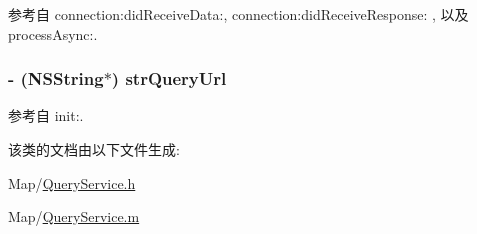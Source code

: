 参考自 connection\-:did\-Receive\-Data\-:, connection\-:did\-Receive\-Response\-: , 以及 process\-Async\-:.

\hypertarget{interface_query_service_a3bded815fbe946f576b68aecd953d43d}{
\subsubsection[{str\-Query\-Url}]{\setlength{\rightskip}{0pt plus 5cm}-\/ (N\-S\-String$\ast$) str\-Query\-Url\hspace{0.3cm}{\ttfamily [protected]}}}\label{interface_query_service_a3bded815fbe946f576b68aecd953d43d}


参考自 init\-:.



该类的文档由以下文件生成\-:\begin{DoxyCompactItemize}
\item 
Map/\hyperlink{_query_service_8h}{Query\-Service.\-h}\item 
Map/\hyperlink{_query_service_8m}{Query\-Service.\-m}\end{DoxyCompactItemize}
